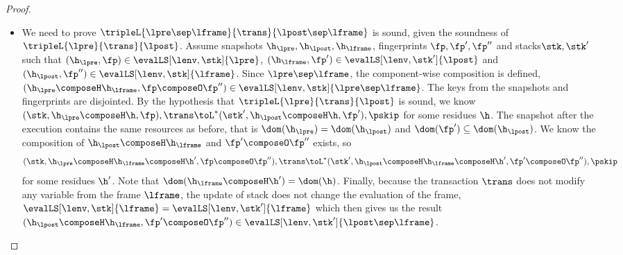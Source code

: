 \begin{proof}
\begin{itemize}
\item {}
We need to prove \( \tripleL{\lpre \sep \lframe }{\trans}{\lpost \sep \lframe} \) is sound, 
given the soundness of  \( \tripleL{\lpre}{\trans}{\lpost} \).
Assume snapshots \( \h_\lpre, \h_\lpost, \h_\lframe \), fingerprints \( \fp, \fp', \fp'' \) and stacks\( \stk, \stk' \) 
such that \( ( \h_\lpre, \fp ) \in \evalLS[\lenv, \stk]{\lpre} \), \( ( \h_\lframe, \fp' ) \in \evalLS[\lenv, \stk']{\lpost} \) and \( ( \h_\lpost, \fp'' ) \in \evalLS[\lenv, \stk]{\lframe}\).
Since \( \lpre \sep \lframe \), the component-wise composition is defined, \ie \( (\h_\lpre \composeH \h_\lframe, \fp \composeO \fp'') \in \evalLS[\lenv, \stk]{\lpre \sep \lframe} \).
The keys from the snapshots and fingerprints are disjointed.
By the hypothesis that \( \tripleL{\lpre}{\trans}{\lpost} \) is sound, 
we know \( ( \stk, \h_\lpre \composeH \h, \fp ), \trans \toL^{*} ( \stk', \h_\lpost \composeH \h, \fp' ), \pskip \) for some residues \( \h \).
The snapshot after the execution contains the same resources as before, that is \( \dom(\h_\lpre) = \dom(\h_\lpost) \) and \( \dom(\fp') \subseteq \dom(\h_\lpost) \).
We know the composition of \( \h_\lpost \composeH \h_\lframe \) and \( \fp' \composeO \fp''\) exists, 
so 
\[ 
    ( \stk, \h_\lpre \composeH \h_\lframe \composeH \h', \fp \composeO \fp''), \trans \toL^{*} ( \stk', \h_\lpost \composeH \h_\lframe \composeH \h', \fp' \composeO \fp'' ), \pskip 
\]
for some residues \( \h' \).
Note that \( \dom(\h_\lframe \composeH \h') = \dom(\h) \).
Finally, because the transaction \( \trans \) does not modify any variable from the frame \( \lframe \), 
the update of stack does not change the evaluation of the frame, 
\( \evalLS[\lenv, \stk]{\lframe} = \evalLS[\lenv, \stk']{\lframe} \) which then gives us the result \( (\h_\lpost \composeH \h_\lframe, \fp' \composeO \fp'') \in \evalLS[\lenv, \stk']{\lpost \sep \lframe} \).
\end{itemize}
\end{proof}

